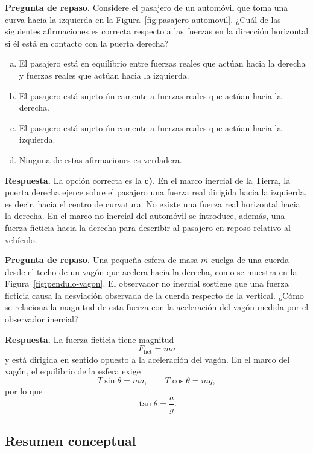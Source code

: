 \textbf{Pregunta de repaso.} Considere el pasajero de un automóvil que toma una curva hacia la izquierda en la Figura~\ref{fig:pasajero-automovil}. ¿Cuál de las siguientes afirmaciones es correcta respecto a las fuerzas en la dirección horizontal si él está en contacto con la puerta derecha?

\begin{enumerate}[a)]
\item El pasajero está en equilibrio entre fuerzas reales que actúan hacia la derecha y fuerzas reales que actúan hacia la izquierda.
\item El pasajero está sujeto únicamente a fuerzas reales que actúan hacia la derecha.
\item El pasajero está sujeto únicamente a fuerzas reales que actúan hacia la izquierda.
\item Ninguna de estas afirmaciones es verdadera.
\end{enumerate}

\figuraPasajeroAutomovil

\textbf{Respuesta.} La opción correcta es la \textbf{c)}. En el marco inercial de la Tierra, la puerta derecha ejerce sobre el pasajero una fuerza real dirigida hacia la izquierda, es decir, hacia el centro de curvatura. No existe una fuerza real horizontal hacia la derecha. En el marco no inercial del automóvil se introduce, además, una fuerza ficticia hacia la derecha para describir al pasajero en reposo relativo al vehículo.

\textbf{Pregunta de repaso.} Una pequeña esfera de masa $m$ cuelga de una cuerda desde el techo de un vagón que acelera hacia la derecha, como se muestra en la Figura~\ref{fig:pendulo-vagon}. El observador no inercial sostiene que una fuerza ficticia causa la desviación observada de la cuerda respecto de la vertical. ¿Cómo se relaciona la magnitud de esta fuerza con la aceleración del vagón medida por el observador inercial?

\figuraPenduloVagon

\textbf{Respuesta.} La fuerza ficticia tiene magnitud
$$ F_{\mathrm{fict}} = ma $$
y está dirigida en sentido opuesto a la aceleración del vagón. En el marco del vagón, el equilibrio de la esfera exige
$$ T\sin\theta = ma, \qquad T\cos\theta = mg, $$
por lo que
$$ \tan\theta = \frac{a}{g}. $$

\subsection{Resumen conceptual}

